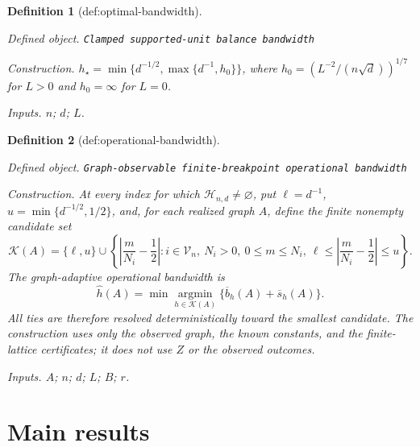 \documentclass{article}
\newtheorem{definition}{Definition}
\begin{document}
\begin{definition}[def:optimal-bandwidth]\label{def:optimal-bandwidth}
\par\smallskip\noindent\emph{Defined object.} \texttt{Clamped supported-\allowbreak{}unit balance bandwidth}
\par\smallskip\noindent\emph{Construction.} \(h_\star=\min\{d^{-1/2},\max\{d^{-1},h_0\}\}\), where \(h_0=(L^{-2}/(n\sqrt d))^{1/7}\) for \(L>0\) and \(h_0=\infty\) for \(L=0\).
\par\smallskip\noindent\emph{Inputs.} \(n\); \(d\); \(L\).
\end{definition}

\begin{definition}[def:operational-bandwidth]\label{def:operational-bandwidth}
\par\smallskip\noindent\emph{Defined object.} \texttt{Graph-\allowbreak{}observable finite-\allowbreak{}breakpoint operational bandwidth}
\par\smallskip\noindent\emph{Construction.} At every index for which \(\mathcal H_{n,d}\ne\varnothing\), put \(\ell=d^{-1}\), \(u=\min\{d^{-1/2},1/2\}\), and, for each realized graph \(A\), define the finite nonempty candidate set
\[
 \mathcal K(A)=\{\ell,u\}\cup
 \left\{\left|\frac m{N_i}-\frac12\right|:
 i\in\mathcal V_n,\ N_i>0,\ 0\leq m\leq N_i,\
 \ell\leq\left|\frac m{N_i}-\frac12\right|\leq u\right\}.
\]
The graph-adaptive operational bandwidth is
\[
 \widehat h(A)=\min\operatorname*{argmin}_{h\in\mathcal K(A)}
 \{\overline b_h(A)+\overline s_h(A)\}.
\]
All ties are therefore resolved deterministically toward the smallest candidate.  The construction uses only the observed graph, the known constants, and the finite-lattice certificates; it does not use \(Z\) or the observed outcomes.
\par\smallskip\noindent\emph{Inputs.} \(A\); \(n\); \(d\); \(L\); \(B\); \(r\).
\end{definition}

\section{Main results}
\end{document}
